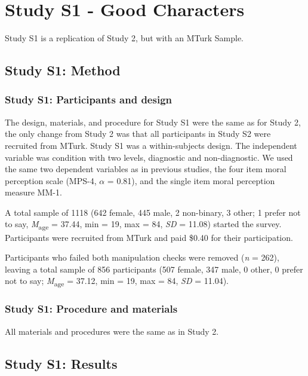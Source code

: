 \documentclass[
  man,floatsintext]{apa6}
\begin{document}
\pagebreak

\section{Study S1 - Good Characters}\label{study-s1---good-characters}

Study S1 is a replication of Study 2, but with an MTurk Sample.

\subsection{Study S1: Method}\label{study-s1-method}

\subsubsection{Study S1: Participants and design}\label{study-s1-participants-and-design}

The design, materials, and procedure for Study S1 were the same as for Study 2, the only change from Study 2 was that all participants in Study S2 were recruited from MTurk. Study S1 was a within-subjects design. The independent variable was condition with two levels, diagnostic and non-diagnostic. We used the same two dependent variables as in previous studies, the four item moral perception scale (MPS-4, \(\alpha\) = 0.81), and the single item moral perception measure MM-1.

A total sample of 1118 (642 female, 445 male, 2 non-binary, 3 other; 1 prefer not to say, \emph{M}\textsubscript{age} = 37.44, min = 19, max = 84, \emph{SD} = 11.08) started the survey. Participants were recruited from MTurk and paid \$0.40 for their participation.

Participants who failed both manipulation checks were removed (\emph{n} = 262), leaving a total sample of 856 participants (507 female, 347 male, 0 other, 0 prefer not to say; \emph{M}\textsubscript{age} = 37.12, min = 19, max = 84, \emph{SD} = 11.04).

\subsubsection{Study S1: Procedure and materials}\label{study-s1-procedure-and-materials}

All materials and procedures were the same as in Study 2.

\subsection{Study S1: Results}\label{study-s1-results}
\end{document}
